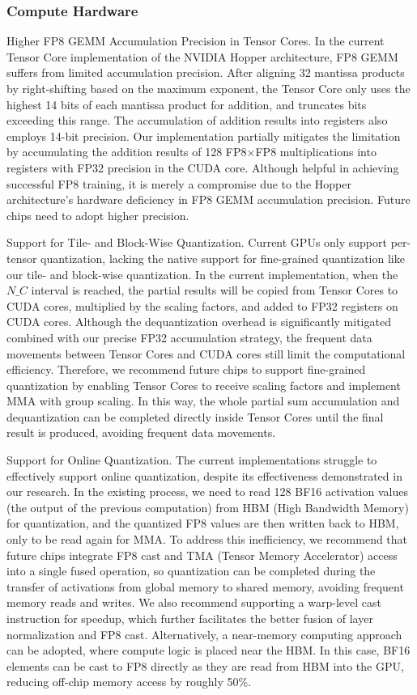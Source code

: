\documentclass[11pt,a4paper]{article}
\begin{document}
\subsubsection{Compute Hardware}

Higher FP8 GEMM Accumulation Precision in Tensor Cores.
In the current Tensor Core implementation of the NVIDIA Hopper architecture, FP8 GEMM suffers from limited accumulation precision. After aligning 32 mantissa products by right-shifting based on the maximum exponent, the Tensor Core only uses the highest 14 bits of each mantissa product for addition, and truncates bits exceeding this range. The accumulation of addition results into registers also employs 14-bit precision. Our implementation partially mitigates the limitation by accumulating the addition results of 128 FP8$\times$FP8 multiplications into registers with FP32 precision in the CUDA core. 
Although helpful in achieving successful FP8 training, it is merely a compromise due to the Hopper architecture's hardware deficiency in FP8 GEMM accumulation precision.
Future chips need to adopt higher precision.

Support for Tile- and Block-Wise Quantization.
Current GPUs only support per-tensor quantization, lacking the native support for fine-grained quantization like our tile- and block-wise quantization.
In the current implementation, when the $N\_C$ interval is reached, the partial results will be copied from Tensor Cores to CUDA cores, multiplied by the scaling factors, and added to FP32 registers on CUDA cores.
Although the dequantization overhead is significantly mitigated combined with our precise FP32 accumulation strategy, the frequent data movements between Tensor Cores and CUDA cores still limit the computational efficiency. 
Therefore, we recommend future chips to support fine-grained quantization by enabling Tensor Cores to receive scaling factors and implement MMA with group scaling. 
In this way, the whole partial sum accumulation and dequantization can be completed directly inside Tensor Cores until the final result is produced, avoiding frequent data movements.

Support for Online Quantization.
The current implementations struggle to effectively support online quantization, despite its effectiveness demonstrated in our research. 
In the existing process, we need to read 128 BF16 activation values (the output of the previous computation) from HBM (High Bandwidth Memory) for quantization, and the quantized FP8 values are then written back to HBM, only to be read again for MMA. 
To address this inefficiency, we recommend that future chips integrate FP8 cast and TMA (Tensor Memory Accelerator) access into a single fused operation, so quantization can be completed during the transfer of activations from global memory to shared memory, avoiding frequent memory reads and writes. 
We also recommend supporting a warp-level cast instruction for speedup, which further facilitates the better fusion of layer normalization and FP8 cast.
Alternatively, a near-memory computing approach can be adopted, where compute logic is placed near the HBM. 
In this case, BF16 elements can be cast to FP8 directly as they are read from HBM into the GPU, reducing off-chip memory access by roughly 50\%.
\end{document}
